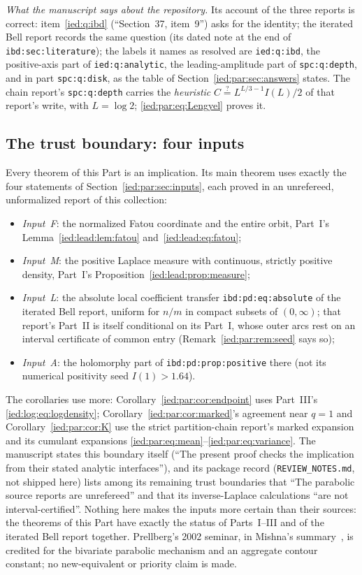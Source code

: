 \documentclass[11pt,letterpaper]{article}
\theoremstyle{remark}\newtheorem{remark}[theorem]{Remark}
\newcommand{\file}[1]{\nolinkurl{#1}}
\begin{document}
\emph{What the manuscript says about the repository.} Its account of the
three reports is correct: item~\ref{ied:q:ibd} (``Section~37, item~9'') asks
for the identity; the iterated Bell report records the same question (its
dated note at the end of \file{ibd:sec:literature}); the labels it names as
resolved are \file{ied:q:ibd}, the positive-axis part of \file{ied:q:analytic},
the leading-amplitude part of \file{spc:q:depth}, and in part
\file{spc:q:disk}, as the table of Section~\ref{ied:par:sec:answers} states. The
chain report's \file{spc:q:depth} carries the \emph{heuristic}
$C\overset{?}{=}L^{L/3-1}I(L)/2$ of that report's write, with $L=\log2$;
\eqref{ied:par:eq:Lengyel} proves it.

\subsection{The trust boundary: four inputs}\label{ied:par:sec:trust}

Every theorem of this Part is an implication. Its main theorem uses exactly
the four statements of Section~\ref{ied:par:sec:inputs}, each proved in an
unrefereed, unformalized report of this collection:
\begin{itemize}
\item \emph{Input~F}: the normalized Fatou coordinate and the entire orbit,
Part~I's Lemma~\ref{ied:lead:lem:fatou} and~\eqref{ied:lead:eq:fatou};
\item \emph{Input~M}: the positive Laplace measure with continuous, strictly
positive density, Part~I's Proposition~\ref{ied:lead:prop:measure};
\item \emph{Input~L}: the absolute local coefficient transfer
\file{ibd:pd:eq:absolute} of the iterated Bell report, uniform for $n/m$ in
compact subsets of $(0,\infty)$; that report's Part~II is itself conditional on
its Part~I, whose outer arcs rest on an interval certificate of common entry
(Remark~\ref{ied:par:rem:seed} says so);
\item \emph{Input~A}: the holomorphy part of \file{ibd:pd:prop:positive}
there (not its numerical positivity seed $I(1)>1.64$).
\end{itemize}
The corollaries use more: Corollary~\ref{ied:par:cor:endpoint} uses Part~III's
\eqref{ied:log:eq:logdensity}; Corollary~\ref{ied:par:cor:marked}'s
agreement near $q=1$ and Corollary~\ref{ied:par:cor:K} use the strict
partition-chain report's marked expansion and its cumulant expansions
\eqref{ied:par:eq:mean}--\eqref{ied:par:eq:variance}. The manuscript states
this boundary itself (``The present proof checks the implication from their
stated analytic interfaces''), and its package record (\file{REVIEW_NOTES.md},
not shipped here) lists among its remaining trust boundaries that ``The
parabolic source reports are unrefereed'' and that its inverse-Laplace
calculations ``are not interval-certified''. Nothing here makes the inputs
more certain than their sources: the theorems of this Part have exactly the
status of Parts~I--III and of the iterated Bell report together. Prellberg's
2002 seminar, in Mishna's summary~\cite{Prellberg}, is credited for the
bivariate parabolic mechanism and an aggregate contour constant; no
new-equivalent or priority claim is made.
\end{document}
